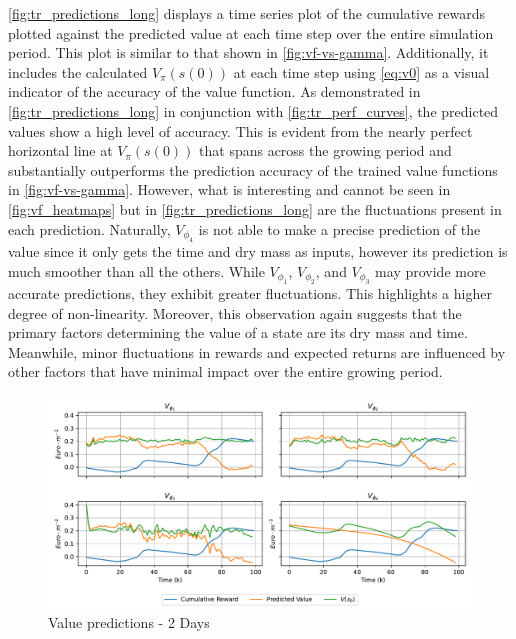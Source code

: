 \autoref{fig:tr_predictions_long} displays a time series plot of the cumulative rewards plotted against the predicted value at each time step over the entire simulation period. This plot is similar to that shown in \autoref{fig:vf-vs-gamma}. Additionally, it includes the calculated $V_\pi (s(0))$ at each time step using \autoref{eq:v0} as a visual indicator of the accuracy of the value function. As demonstrated in \autoref{fig:tr_predictions_long} in conjunction with \autoref{fig:tr_perf_curves}, the predicted values show a high level of accuracy. This is evident from the nearly perfect horizontal line at $V_\pi (s(0))$ that spans across the growing period and substantially outperforms the prediction accuracy of the trained value functions in \autoref{fig:vf-vs-gamma}. However, what is interesting and cannot be seen in \autoref{fig:vf_heatmaps} but in \autoref{fig:tr_predictions_long} are the fluctuations present in each prediction. Naturally, $V_{\phi_4}$ is not able to make a precise prediction of the value since it only gets the time and dry mass as inputs, however its prediction is much smoother than all the others. While $V_{\phi_1}$, $V_{\phi_2}$, and $V_{\phi_3}$ may provide more accurate predictions, they exhibit greater fluctuations. This highlights a higher degree of non-linearity. Moreover, this observation again suggests that the primary factors determining the value of a state are its dry mass and time. Meanwhile, minor fluctuations in rewards and expected returns are influenced by other factors that have minimal impact over the entire growing period.



\begin{figure}[H]
	\centering
	\includegraphics[width = \textwidth]{figures/vf_time_predictions_short.pdf}
	\caption{Value predictions - 2 Days}
	\label{fig:tr_predictions_short}
\end{figure}

